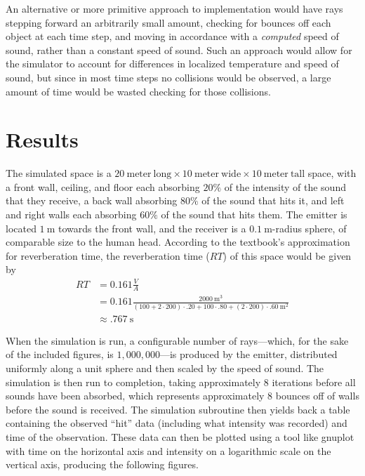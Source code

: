 \documentclass[10pt]{article}
\begin{document}
An alternative or more primitive approach to implementation would have rays
stepping forward an arbitrarily small amount, checking for bounces off each
object at each time step, and moving in accordance with a \emph{computed} speed
of sound, rather than a constant speed of sound.  Such an approach would allow
for the simulator to account for differences in localized temperature and speed
of sound, but since in most time steps no collisions would be observed, a large
amount of time would be wasted checking for those collisions.

\section{Results}

The simulated space is a $20~\mathrm{meter}~\text{long} \times
10~\mathrm{meter}~\text{wide} \times 10~\mathrm{meter}~\text{tall}$ space, with
a front wall, ceiling, and floor each absorbing $20\%$ of the intensity of the
sound that they receive, a back wall absorbing $80\%$ of the sound that hits it,
and left and right walls each absorbing $60\%$ of the sound that hits them.  The
emitter is located $1~\mathrm{m}$ towards the front wall, and the receiver is a
$0.1~\mathrm{m}$-radius sphere, of comparable size to the human head.  According
to the textbook's approximation for reverberation time, the reverberation time
($RT$) of this space would be given by \begin{align*} RT &= 0.161 \frac{V}{A}
  \\ &= 0.161 \frac{2000~\mathrm{m^3}}{(100 + 2 \cdot 200) \cdot .20 + 100 \cdot
    .80 + (2 \cdot 200) \cdot .60~\mathrm{m^2}} \\ &\approx
  .767~\mathrm{s} \end{align*}

When the simulation is run, a configurable number of rays---which, for the sake
of the included figures, is $1,000,000$---is produced by the emitter,
distributed uniformly along a unit sphere and then scaled by the speed of sound.
The simulation is then run to completion, taking approximately $8$ iterations
before all sounds have been absorbed, which represents approximately $8$ bounces
off of walls before the sound is received.  The simulation subroutine then
yields back a table containing the observed ``hit'' data (including what
intensity was recorded) and time of the observation.  These data can then be
plotted using a tool like gnuplot with time on the horizontal axis and intensity
on a logarithmic scale on the vertical axis, producing the following figures.
\end{document}
